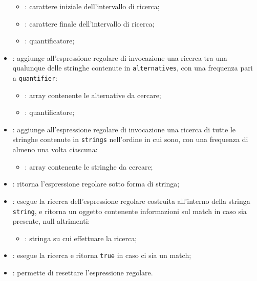 \begin{itemize}
	\begin{itemize}
		\item {}: carattere iniziale dell'intervallo di ricerca;
		\item {}: carattere finale dell'intervallo di ricerca;
		\item {}: quantificatore;
	\end{itemize}
	\item {}: aggiunge all'espressione regolare di invocazione una ricerca tra una qualunque delle stringhe contenute in \texttt{alternatives}, con una frequenza pari a \texttt{quantifier}:
	\begin{itemize}
		\item {}: array contenente le alternative da cercare;
		\item {}: quantificatore;
	\end{itemize}
	\item {}: aggiunge all'espressione regolare di invocazione una ricerca di tutte le stringhe contenute in \texttt{strings} nell'ordine in cui sono, con una frequenza di almeno una volta ciascuna:
	\begin{itemize}
		\item {}: array contenente le stringhe da cercare;
	\end{itemize}
	\item {}: ritorna l'espressione regolare sotto forma di stringa;
	\item {}: esegue la ricerca dell'espressione regolare costruita all'interno della stringa \texttt{string}, e ritorna un oggetto contenente informazioni sul match in caso sia presente, null altrimenti:
	\begin{itemize}
		\item {}: stringa su cui effettuare la ricerca;
	\end{itemize}
	\item {}: esegue la ricerca e ritorna \texttt{true} in caso ci sia un match;
	\item {}: permette di resettare l'espressione regolare.
\end{itemize}

